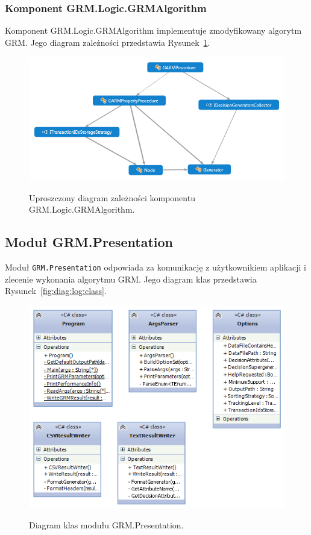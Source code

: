 \documentclass[a4paper,10pt]{article}
\begin{document}
  \subsubsection{Komponent GRM.Logic.GRMAlgorithm}
  Komponent GRM.Logic.GRMAlgorithm implementuje zmodyfikowany algorytm GRM.
  Jego diagram zależności przedstawia Rysunek~\ref{fig:diag:log:GRMAlgorithm}.
  
  \begin{figure}[!ht]
   \begin{center}
    \scalebox{0.7}
    {
     \includegraphics{../diagrams/GRMAlgorithm_dependency_diagram.png}
    }
   \end{center}
   \caption{
    Uproszczony diagram zależności komponentu GRM.Logic.GRMAlgorithm.
   }
   \label{fig:diag:log:GRMAlgorithm}
  \end{figure}


 \subsection{Moduł GRM.Presentation}
 Moduł \verb+GRM.Presentation+ odpowiada za komunikację z użytkownikiem aplikacji i zlecenie wykonania algorytmu GRM.
 Jego diagram klas przedstawia Rysunek~\ref{fig:diag:log:class}.
 
 \begin{figure}[!ht]
  \begin{center}
   \scalebox{0.55}
   {
    \includegraphics{../diagrams/Presentation_class_diagram.png}
   }
  \end{center}
  \caption{
   Diagram klas modułu GRM.Presentation.
  }
  \label{fig:diag:pres:class}
 \end{figure}
 
\end{document}
